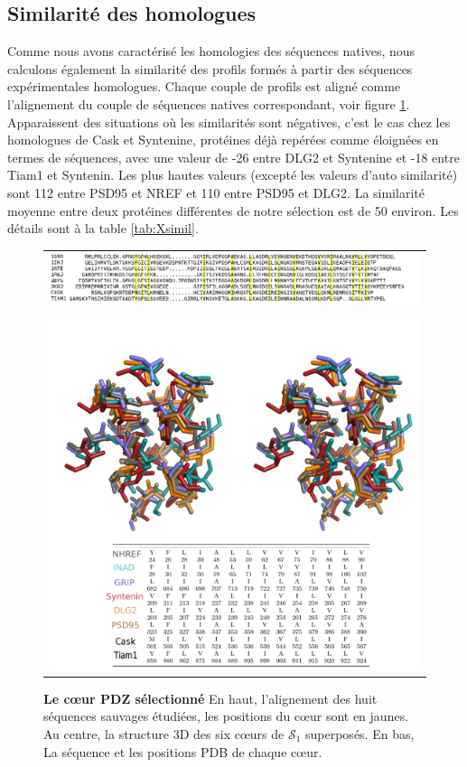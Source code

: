     \subsection{Similarité des homologues}

Comme nous avons caractérisé les homologies des séquences natives, nous calculons également la similarité des profils formés à partir des séquences expérimentales homologues. Chaque couple de profils est aligné comme l'alignement du couple de séquences natives correspondant, voir figure \ref{fig:corePDZ}. Apparaissent des situations où les similarités sont négatives, c'est le cas chez les homologues de Cask et Syntenine, protéines déjà repérées comme éloignées en termes de séquences, avec une valeur de -26 entre DLG2 et Syntenine et -18 entre Tiam1  et Syntenin. Les plus hautes valeurs (excepté les valeurs d'auto similarité) sont  112 entre PSD95 et NREF et 110 entre PSD95 et DLG2. La similarité moyenne entre deux protéines différentes de notre sélection est de 50 environ. Les détails sont à la table \ref{tab:Xsimil}. 
    
    \begin{figure}[!htbp]
     \centering
     \begin{tabular}{c}
       \includegraphics[width=18cm]{images/natives_alignees.png} \\
       \includegraphics[width=16cm]{images/corePDZ2.png} \\
     \end{tabular}
     \caption{\textbf{Le cœur PDZ sélectionné} En haut, l'alignement des huit séquences sauvages étudiées, les positions du cœur sont en jaunes. Au centre, la structure 3D des six cœurs de $\mathcal{S}_1$ superposés. En bas, La séquence et les \og positions PDB \fg de chaque cœur.}
     \label{fig:corePDZ}      
    \end{figure}
    
